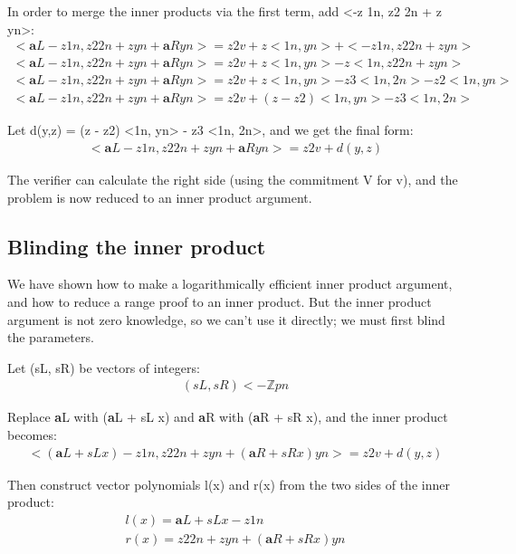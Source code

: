 \documentclass{article}
\begin{document}
In order to merge the inner products via the first term, add <-z 1n, z2 2n + z yn>:
\begin{eqnarray}
  <\textbf{a}L - z 1n, z2 2n + z yn + \textbf{a}Ryn> = z2 v + z <1n, yn> + <-z 1n, z2 2n + z yn>\\
  <\textbf{a}L - z 1n, z2 2n + z yn + \textbf{a}Ryn> = z2 v + z <1n, yn> - z <1n, z2 2n + z yn>\\
  <\textbf{a}L - z 1n, z2 2n + z yn + \textbf{a}Ryn> = z2 v + z <1n, yn> - z3 <1n, 2n> - z2 <1n, yn>\\
  <\textbf{a}L - z 1n, z2 2n + z yn + \textbf{a}Ryn> = z2 v + (z - z2) <1n, yn> - z3 <1n, 2n>
\end{eqnarray}
  
Let d(y,z) = (z - z2) <1n, yn> - z3 <1n, 2n>, and we get the final form:
\begin{eqnarray}
  <\textbf{a}L - z 1n, z2 2n + z yn + \textbf{a}Ryn> = z2 v + d(y,z)
\end{eqnarray}

The verifier can calculate the right side (using the commitment V for v), and the problem is now reduced to an inner product argument.


\subsection{Blinding the inner product}

We have shown how to make a logarithmically efficient inner product argument, and how to reduce a range proof to an inner product.  But the inner product argument is not zero knowledge, so we can't use it directly; we must first blind the parameters.

Let (sL, sR) be vectors of integers:
\begin{eqnarray}
  (sL, sR) <- \mathbb{Z}pn
\end{eqnarray}

Replace \textbf{a}L with (\textbf{a}L + sL x) and \textbf{a}R with (\textbf{a}R + sR x), and the inner product becomes:
\begin{eqnarray}
  <(\textbf{a}L + sL x) - z 1n, z2 2n + z yn + (\textbf{a}R+ sR x)yn> = z2 v + d(y,z)
\end{eqnarray}

Then construct vector polynomials l(x) and r(x) from the two sides of the inner product:
\begin{eqnarray}
  l(x) = \textbf{a}L + sL x - z 1n\\
  r(x) = z2 2n + z yn + (\textbf{a}R+ sR x)yn
\end{eqnarray}
\end{document}
